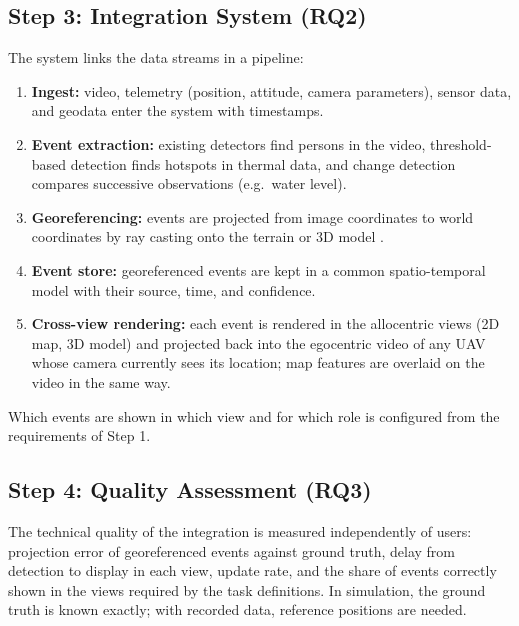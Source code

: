 \documentclass{article}
\begin{document}
\subsection{Step 3: Integration System (RQ2)}
The system links the data streams in a pipeline:
\begin{enumerate}
  \item \textbf{Ingest:} video, telemetry (position, attitude, camera parameters), sensor data, and geodata enter the system with timestamps.
  \item \textbf{Event extraction:} existing detectors find persons in the video, threshold-based detection finds hotspots in thermal data, and change detection compares successive observations (e.g.\ water level).
  \item \textbf{Georeferencing:} events are projected from image coordinates to world coordinates by ray casting onto the terrain or 3D model \cite{paulin2023raycast, ren2022argeoreg}.
  \item \textbf{Event store:} georeferenced events are kept in a common spatio-temporal model with their source, time, and confidence.
  \item \textbf{Cross-view rendering:} each event is rendered in the allocentric views (2D map, 3D model) and projected back into the egocentric video of any UAV whose camera currently sees its location; map features are overlaid on the video in the same way.
\end{enumerate}
Which events are shown in which view and for which role is configured from the requirements of Step 1.

\subsection{Step 4: Quality Assessment (RQ3)}
The technical quality of the integration is measured independently of users:
projection error of georeferenced events against ground truth, delay from detection to display in each view, update rate, and the share of events correctly shown in the views required by the task definitions.
In simulation, the ground truth is known exactly; with recorded data, reference positions are needed.
\end{document}
